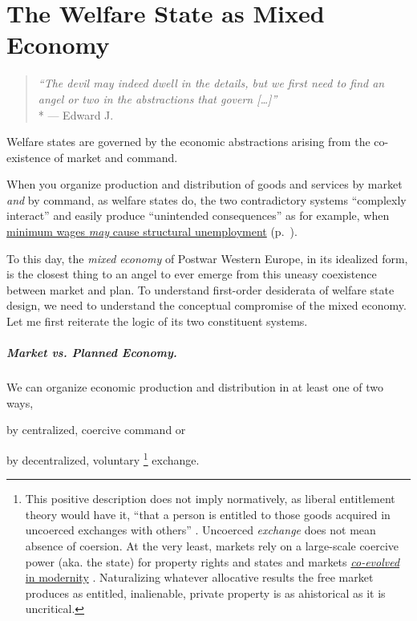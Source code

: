 
\chapter[The Mixed Economy]{The Welfare State as Mixed Economy} \label{chap:mixed-economy}

\begin{quote}
	\emph{``The devil may indeed dwell in the details, but we first need to find an angel or two in the abstractions that govern [\ldots]''}\\*
	--- Edward J. \cite[K117]{McCaffery2002}
\end{quote}

Welfare states are governed by the economic abstractions arising from the co-existence of market and command.

When you organize production and distribution of goods and services by market \emph{and} by command, as welfare states do, the two contradictory systems ``complexly interact'' \citep{Perrow-1999-aa} and easily produce ``unintended consequences'' \citep{Merton-1936-aa} as for example, when \hyperref[sec:price-floors]{minimum wages \emph{may} cause structural unemployment} (p.~\pageref{sec:price-floors}).

To this day, the \emph{mixed economy} of Postwar Western Europe, in its idealized form, is the closest thing to an angel to ever emerge from this uneasy coexistence between market and plan. 
To understand first-order desiderata of welfare state design, we need to understand the conceptual compromise of the mixed economy. 
Let me first reiterate the logic of its two constituent systems.

\paragraph[Market vs. Plan]{Market vs. Planned Economy.}  \label{sec:market-vs-command} 

We can organize economic production and distribution in at least one of two ways, 
\begin{inparaenum}
	\item 
		by centralized, coercive command or
	\item 
		by decentralized, voluntary
		\footnote{
			\label{fn:tilly} This positive description does not imply normatively, as liberal entitlement theory would have it, ``that a person is entitled to those goods acquired in uncoerced exchanges with others'' \citep[149]{Nozick1974,Friedman1962}. 
			Uncoerced \emph{exchange} does not mean absence of coersion. 
			At the very least, markets rely on a large-scale coercive power (aka. the state) for property rights and states and markets \hyperref[sec:modernity]{\emph{co-evolved} in modernity} \citep{Tilly-1985-aa}. 
			Naturalizing whatever allocative results the free market produces as entitled, inalienable, private property is as ahistorical as it is uncritical.
		} %
		exchange. 
\end{inparaenum}
 
